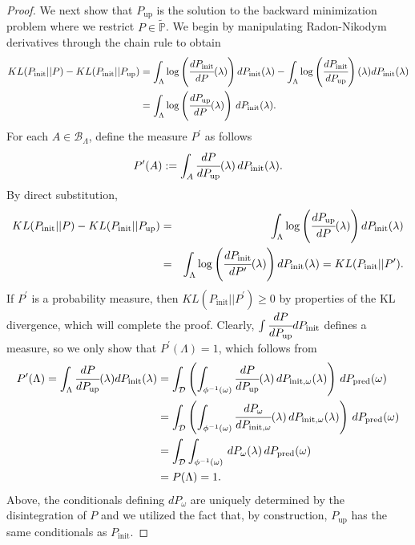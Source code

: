 \documentclass[10pt,a4paper]{amsart}
\newcommand{\B}{\mathcal{B}}
\newcommand{\initmeasomega}{P_{\text{init}, \omega}}
\newcommand{\initmeas}{P_{\text{init}}}
\newcommand{\predictmeas}{P_\text{pred}}
\newcommand{\pspace}{\Lambda}
\newcommand{\p}{\mathbb{P}}
\newcommand{\updatemeas}{P_{\text{up}}}
\begin{document}
\begin{proof}
We next show that $\updatemeas$ is the solution to the backward minimization problem where we restrict $P\in\tilde{\p}$.
We begin by manipulating Radon-Nikodym derivatives through the chain rule to obtain
\begin{align*}
KL( \initmeas || P) - KL( \initmeas || \updatemeas) &= \int_{\Lambda} \log\left(\cfrac{d\initmeas}{dP}(\lambda)\right) d\initmeas(\lambda) - \int_{\Lambda} \log\left(\cfrac{d\initmeas}{d\updatemeas}\right)(\lambda) d\initmeas(\lambda)\\
&= \int_{\Lambda} \log\left(\cfrac{d\updatemeas}{dP}(\lambda)\right) \, d\initmeas(\lambda).
\end{align*}
For each $A\in\B_\Lambda$, define the measure $P^{\prime}$ as follows %
\begin{equation}\label{eq:change_of_conditionals}
    P^{\prime}(A) := \int_A \cfrac{dP}{d\updatemeas}(\lambda) \, d\initmeas(\lambda).
\end{equation}
By direct substitution, 
\begin{eqnarray*}
    KL( \initmeas || P) - KL( \initmeas || \updatemeas) &=& \int_{\Lambda} \log\left(\cfrac{d\updatemeas}{dP}(\lambda)\right) d\initmeas(\lambda) \\
    &=& \int_{\Lambda} \log\left(\cfrac{d\initmeas}{dP^{\prime}}(\lambda)\right) d\initmeas(\lambda) = KL(P_\text{init} || P^{\prime}).
\end{eqnarray*}    
If $P^{\prime}$ is a probability measure, then $KL(P_\text{init} || P^{\prime})\geq 0$ by properties of the KL divergence, which will complete the proof. 
Clearly, $\int \cfrac{dP}{d\updatemeas} d\initmeas$ defines a measure, so we only show that $P^{\prime}(\Lambda) = 1$, which follows from 
\begin{align*}
    P^{\prime}(\Lambda) = \int_{\Lambda} \cfrac{dP}{d\updatemeas}(\lambda) d\initmeas(\lambda) &= \int_{\mathcal{D}} \left(\int_{\phi^{-1}(\omega)} \cfrac{dP}{d\updatemeas}(\lambda) \, d\initmeasomega(\lambda)\right) \, d\predictmeas(\omega) \\
    &= \int_{\mathcal{D}} \left(\int_{\phi^{-1}(\omega)} \cfrac{dP_\omega}{d\initmeasomega}(\lambda) \, d\initmeasomega(\lambda) \right)\, d\predictmeas(\omega) \\
    &= \int_{\mathcal{D}} \int_{\phi^{-1}(\omega)} \, dP_\omega(\lambda) \, d\predictmeas(\omega) \\
    &= P(\pspace) = 1.
\end{align*}
Above, the conditionals defining $dP_\omega$ are uniquely determined by the disintegration of $P$ and we utilized the fact that, by construction, $\updatemeas$ has the same conditionals as $\initmeas$. 
\end{proof}
\end{document}
